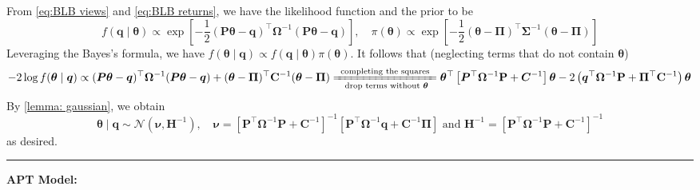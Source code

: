 \documentclass[11pt]{article}
\theoremstyle{plain} %
\newenvironment{topic}
  {\color{C2}\normalfont\begin{framed}\begingroup}
    {\endgroup\end{framed}}
\theoremstyle{remark}
\begin{document}
\begin{topic}
\begin{enumerate}[label=(\alph*)]
          From \cref{eq:BLB views} and \cref{eq:BLB returns}, we have the likelihood function and the prior to be
          $$
            f(\boldsymbol{q} \mid \boldsymbol{\theta}) \propto \exp \left[-\frac{1}{2}(\boldsymbol{P} \boldsymbol{\theta}-\boldsymbol{q})^\top \boldsymbol{\Omega}^{-1}(\boldsymbol{P} \boldsymbol{\theta}-\boldsymbol{q})\right], \quad \pi(\boldsymbol{\theta}) \propto \exp \left[-\frac{1}{2}(\boldsymbol{\theta} -\boldsymbol{\Pi})^\top \boldsymbol{\Sigma}^{-1}(\boldsymbol{\theta} -\boldsymbol{\Pi})\right]
          $$
          Leveraging the Bayes's formula, we have $f(\boldsymbol{\theta}\mid \boldsymbol{q}) \propto f(\boldsymbol{q} \mid \boldsymbol{\theta}) \pi(\boldsymbol{\theta})$. It follows that (neglecting terms that do not contain $\boldsymbol{\theta}$)
          $$
            -2\log f(\boldsymbol{\theta}\mid \boldsymbol{q}) \propto (\boldsymbol{P} \boldsymbol{\theta} -\boldsymbol{q})^\top \boldsymbol{\Omega}^{-1}(\boldsymbol{P} \boldsymbol{\theta}-\boldsymbol{q})+(\boldsymbol{\theta}-\boldsymbol{\Pi})^\top \mathbf{C}^{-1}(\boldsymbol{\theta}-\boldsymbol{\Pi}) \xlongequal[\text{ drop terms without $\boldsymbol{\theta}$}]{\text{ completing the squares }}\boldsymbol{\theta}^\top\left[\boldsymbol{P}^\top \boldsymbol{\Omega}^{-1} \mathbf{P}+\boldsymbol{C}^{-1}\right] \boldsymbol{\theta}-2\left(\boldsymbol{q}^\top \boldsymbol{\Omega}^{-1} \mathbf{P}+\boldsymbol{\Pi}^\top \mathbf{C}^{-1}\right) \boldsymbol{\theta}
          $$
          By \cref{lemma: gaussian}, we obtain
          $$
            \boldsymbol{\theta}\mid \boldsymbol{q} \sim \mathcal{N}\left(\boldsymbol{\nu}, \boldsymbol{H}^{-1}\right), \quad \boldsymbol{\nu}=\left[\boldsymbol{P}^\top \boldsymbol{\Omega}^{-1} \boldsymbol{P}+\boldsymbol{C}^{-1}\right]^{-1}\left[\boldsymbol{P}^\top \boldsymbol{\Omega}^{-1} \boldsymbol{q}+\boldsymbol{C}^{-1} \boldsymbol{\Pi}\right] \text{ and } \boldsymbol{H}^{-1}=\left[\boldsymbol{P}^\top \boldsymbol{\Omega}^{-1} \boldsymbol{P}+\boldsymbol{C}^{-1}\right]^{-1}
          $$
          as desired.

  \end{enumerate}
  \vspace*{0.8em}
  \hrule

  \textbf{APT Model:}


\end{topic}
\end{document}
